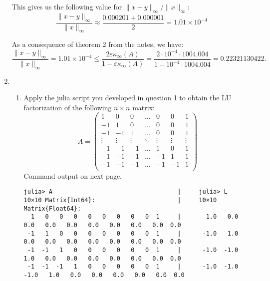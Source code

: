 \documentclass[11pt]{article}
\begin{document}
\begin{enumerate}
	      This gives us the following value for \(\lVert x - y \rVert_\infty / \lVert x \rVert_\infty\):
	      \[\frac{\lVert x - y \rVert_\infty}{\lVert x \rVert_\infty}
		      \approx \frac{0.000201 + 0.000001}2 = 1.01 \times 10^{-4}\]

	      As a consequence of theorem 2 from the notes, we have:
	      \[\frac{\lVert x - y \rVert_\infty}{\lVert x \rVert_\infty} = 1.01 \times 10^{-4} \leq \frac{2\varepsilon \kappa_\infty(A)}{1 - \varepsilon \kappa_\infty(A)} = \frac{2 \cdot 10^{-4} \cdot 1004.004}{1 - 10^{-4} \cdot 1004.004} = 0.22321130422.\]

	\item \begin{enumerate}
		      \item Apply the julia script you developed in question 1 to obtain the LU factorization of the following \(n \times n\) matrix:
		            \[A = \left(\begin{array}{rrrrrrr}
					            1      & 0      & 0      & \hdots & 0      & 0      & 1      \\
					            -1     & 1      & 0      & \hdots & 0      & 0      & 1      \\
					            -1     & -1     & 1      & \hdots & 0      & 0      & 1      \\
					            \vdots & \vdots & \vdots & \ddots & \vdots & \vdots & \vdots \\
					            -1     & -1     & -1     & \hdots & 1      & 0      & 1      \\
					            -1     & -1     & -1     & \hdots & -1     & 1      & 1      \\
					            -1     & -1     & -1     & \hdots & -1     & -1     & 1      \\
				            \end{array}\right)\]
		            Command output on next page.
		            \newpage
		            \scriptsize
		            \begin{verbatim}
julia> A                                   |     julia> L
10×10 Matrix{Int64}:                       |     10×10 Matrix{Float64}:
  1   0   0   0   0   0   0   0   0  1     |       1.0   0.0   0.0   0.0   0.0   0.0   0.0   0.0   0.0  0.0
 -1   1   0   0   0   0   0   0   0  1     |      -1.0   1.0   0.0   0.0   0.0   0.0   0.0   0.0   0.0  0.0
 -1  -1   1   0   0   0   0   0   0  1     |      -1.0  -1.0   1.0   0.0   0.0   0.0   0.0   0.0   0.0  0.0
 -1  -1  -1   1   0   0   0   0   0  1     |      -1.0  -1.0  -1.0   1.0   0.0   0.0   0.0   0.0   0.0  0.0

\end{verbatim}
\end{enumerate}
\end{enumerate}
\end{document}

